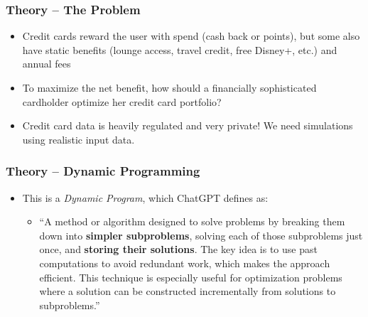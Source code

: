 \begin{frame}
    \frametitle{Theory -- The Problem}
    \begin{itemize}
        \item Credit cards reward the user with spend (cash back or points), but some also have static benefits (lounge access, travel credit, free Disney+, etc.) and annual fees
        \bigskip
        \item To maximize the net benefit, how should a financially sophisticated cardholder optimize her credit card portfolio?
        \bigskip
        \item Credit card data is heavily regulated and very private! We need simulations using realistic input data.
    \end{itemize}
\end{frame}    

\begin{frame}
    \frametitle{Theory -- Dynamic Programming}
    \begin{itemize}
        \item This is a \emph{Dynamic Program}, which ChatGPT defines as:  
        \begin{itemize}
            \item ``A method or algorithm designed to solve problems by breaking them down into {\bf simpler subproblems}, solving each of those subproblems just once, and {\bf storing their solutions}. The key idea is to use past computations to avoid redundant work, which makes the approach efficient. This technique is especially useful for optimization problems where a solution can be constructed incrementally from solutions to subproblems.''
        \end{itemize}    
    \end{itemize}
\end{frame}    


